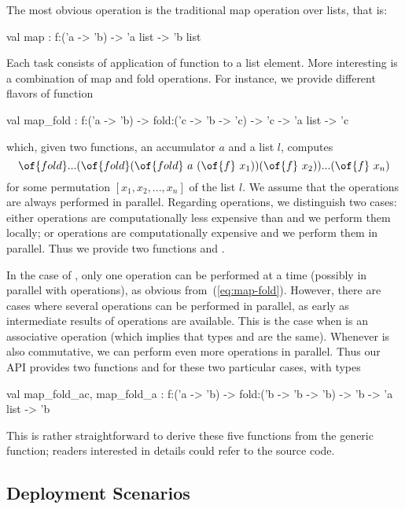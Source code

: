 \documentclass{llncs}
\begin{document}
The most obvious operation is the traditional map operation over
lists, that is:
\begin{ocaml}
  val map : f:('a -> 'b) -> 'a list -> 'b list
\end{ocaml}
Each task consists of application of function  to a list element.
More interesting is a combination of map and fold operations.
For instance, we provide different flavors of function
\begin{ocaml}
  val map_fold :
    f:('a -> 'b) -> fold:('c -> 'b -> 'c) -> 'c -> 'a list -> 'c
\end{ocaml}
which, given two functions, an accumulator $a$ and a list $l$, computes
\begin{equation}\label{eq:map-fold}
  \of{fold} ... (\of{fold} (\of{fold} ~ a ~ (\of{f} ~ x_1)) (\of{f} ~ x_2))
  ... (\of{f} ~ x_n)
\end{equation}
for some permutation $[x_1,x_2,...,x_n]$ of the list $l$.
We assume that the  operations are always performed in parallel.
Regarding  operations, we distinguish two cases:
either  operations are computationally less expensive
than  and we perform them locally;
or  operations are computationally expensive and we
perform them in parallel.
Thus we provide two functions  and .

In the case of , only one  operation can
be performed at a time (possibly in parallel with 
operations), as obvious from~(\ref{eq:map-fold}). However, there are
cases where several  operations can be performed in parallel,
as early as intermediate results of  operations are available.
This is the case when  is an associative operation (which
implies that types  and  are the same).
Whenever
 is also commutative, we can perform even more 
operations in parallel. Thus our API provides two functions
 and  for these two particular cases,
with types
\begin{ocaml}
  val map_fold_ac, map_fold_a : 
    f:('a -> 'b) -> fold:('b -> 'b -> 'b) -> 'b -> 'a list -> 'b 
\end{ocaml}
This is rather straightforward to derive these five functions from the
generic  function; readers interested in details could
refer to the source code.

\subsection{Deployment Scenarios}
\end{document}
